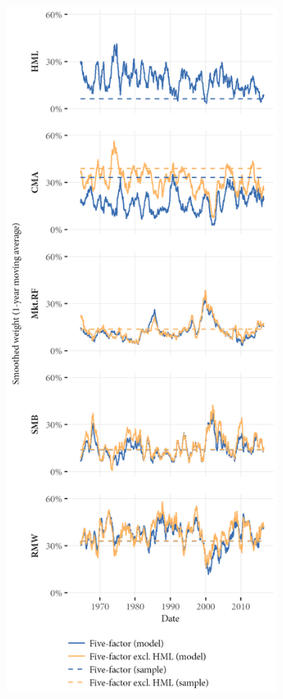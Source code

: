 \begin{figure}[p]
  \centering
  \footnotesize
  \begin{subfigure}{0.45\textwidth}
    \includegraphics[width=\textwidth]{graphics/weights/main_Weights_MV_5F_EXCL_HML_5F.png}

\end{subfigure}
\end{figure}
